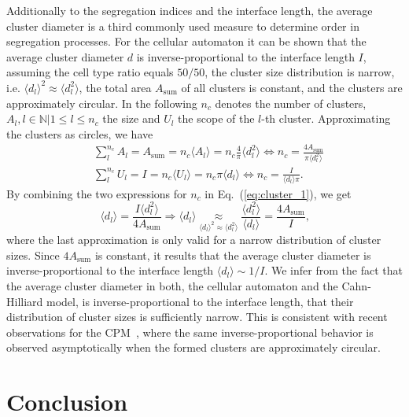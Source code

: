 \documentclass[10pt,letterpaper]{article}
\renewcommand{\eqref}[1]{Eq.~(\ref{eq:#1})}
\begin{document}
Additionally to the segregation indices and the interface length, the
average cluster diameter is a third commonly used measure to determine
order in segregation processes. For the cellular automaton it can be
shown that the average cluster diameter $d$ is inverse-proportional to
the interface length $I$, assuming the cell type ratio equals $50/50$,
the cluster size distribution is narrow, i.e.
$\langle d_l \rangle^2 \approx \langle d_l^2 \rangle$, the total area
$A_\text{sum}$ of all clusters is constant, and the clusters are
approximately circular. In the following $n_c$ denotes the number of
clusters, $A_l, l\in\mathbb{N}|1\leq l\leq n_c$ the size and $U_l$ the
scope of the $l$-th cluster. Approximating the clusters as circles, we
have
%
\begin{equation}
  \label{eq:cluster_1}
  \begin{split}
    & \sum_{l}^{n_c}{A_l} = A_\text{sum} = n_c \langle A_l \rangle = n_c \frac{4}{\pi}\langle d_l^2 \rangle \Leftrightarrow n_c=\frac{4A_\text{sum}}{\pi\langle d_l^2 \rangle}\\
    & \sum_{l}^{n_c}{U_l} = I = n_c\langle U_l \rangle = n_c\pi\langle
    d_l \rangle \Leftrightarrow n_c = \frac{I}{\langle d_l \rangle\pi}
    \text{.}
  \end{split}
\end{equation}
%
By combining the two expressions for $n_c$ in \eqref{cluster_1}, we get
%
\begin{equation}
  \label{eq:cluster_2}
  \langle d_l \rangle = \frac{I\langle d_l^2 \rangle}{4A_\text{sum}}
  \Rightarrow \langle d_l \rangle \underset{\langle d_l \rangle^2
    \approx \langle d_l^2 \rangle}{\approx} \frac{\langle d_l^2
    \rangle}{\langle d_l \rangle} = \frac{4 A_\text{sum}}{I}\text{,}
\end{equation}
%
where the last approximation is only valid for a narrow distribution
of cluster sizes. Since $4A_\text{sum}$ is constant, it results that
the average cluster diameter is inverse-proportional to the interface
length $\langle d_l \rangle\sim 1/I$. We infer from the fact that the
average cluster diameter in both, the cellular automaton and the
Cahn-Hilliard model, is inverse-proportional to the interface length,
that their distribution of cluster sizes is sufficiently narrow. This
is consistent with recent observations for the CPM~\cite{Dur2021},
where the same inverse-proportional behavior is observed
asymptotically when the formed clusters are approximately circular.

\section*{Conclusion}
\end{document}
